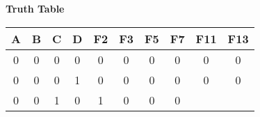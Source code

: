 \textbf{Truth Table }

\begin{tabular}{|c|c|c|c||c|c|c|c|c|c|}
\hline
A & B & C & D

  & F2

  & F3

  & F5

  & F7

  & F11

  & F13
 \\
\hline

  
  
  0 & 0 & 0 & 0
  
    
    
    & 0
  
    
    
    & 0
  
    
    
    & 0
  
    
    
    & 0
  
    
    
    & 0
  
    
    
    & 0
   \\
  

  
  
  0 & 0 & 0 & 1
  
    
    
    & 0
  
    
    
    & 0
  
    
    
    & 0
  
    
    
    & 0
  
    
    
    & 0
  
    
    
    & 0
   \\
  

  
  
  0 & 0 & 1 & 0
  
    
    
    & 1
  
    
    
    & 0
  
    
    
    & 0
  
    
    
    & 0
  
    
    

\end{tabular}
